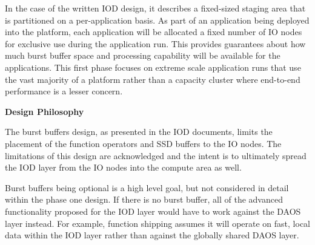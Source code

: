 \documentclass{sig-alt-gov2}
\begin{document}
In the case of the written IOD design, it describes a fixed-sized staging area
that is partitioned on a per-application basis. As part of an application
being deployed into the platform, each application will be allocated a fixed
number of IO nodes for exclusive use during the application run. This provides
guarantees about how much burst buffer space and processing capability will be
available for the applications.
%
This first phase focuses on
extreme scale application runs that use the vast majority of a platform rather
than a capacity cluster where end-to-end performance is a lesser concern.

\noindent\textbf{Design Philosophy}

The burst buffers design, as presented in the IOD documents, limits the
placement of the function operators and SSD buffers to the IO nodes. The
limitations of this design are acknowledged and the intent is to ultimately
spread the IOD layer from the IO nodes into the compute area as well.

Burst buffers being optional is a high level goal, but not considered in detail
within the phase one design. If there is no burst buffer, all of the advanced
functionality proposed for the IOD layer would have to work against the DAOS
layer instead. For example, function shipping assumes it will operate on fast,
local data within the IOD layer rather than against the globally shared DAOS
layer.
\end{document}
